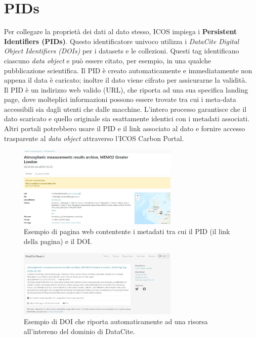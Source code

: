 \section{PIDs}
Per collegare la proprietà dei dati al dato stesso, ICOS impiega i \textbf{Persistent Identifiers (PIDs)}.
Questo identificatore univoco utilizza i \textit{DataCite Digital Object Identifiers (DOIs)} per i datasets
e le collezioni. Questi tag identificano ciascuno \textit{data object} e può essere citato, per esempio,
in una qualche pubblicazione scientifica. Il PID è creato automaticamente e immediatamente
non appena il data è caricato; inoltre il dato viene cifrato per assicurarne la validità.\\

Il PID è un indirizzo web valido (URL), che riporta ad una sua specifica landing page,
dove molteplici informazioni possono essere trovate tra cui i meta-data accessibili sia
dagli utenti che dalle macchine. L'intero processo garantisce che il dato scaricato e quello
originale sia esattamente identici con i metadati associati. Altri portali 
potrebbero usare il PID e il link associato al dato e fornire accesso trasparente al \textit{data object}
attraverso l'ICOS Carbon Portal.

\begin{figure}[h!]
    \centering
    \includegraphics[width=0.7\textwidth]{figures/PIDex.JPG}
    \caption{Esempio di pagina web contentente i metadati tra cui il PID (il link della pagina) e il DOI.}
    \label{figure:PIDex}
\end{figure}

\begin{figure}[h!]
    \centering
    \includegraphics[width=0.7\textwidth]{figures/DOIex.JPG}
    \caption{Esempio di DOI che riporta automaticamente ad una risorsa all'intereno del dominio di DataCite.}
    \label{figure:DOIex}
\end{figure}


